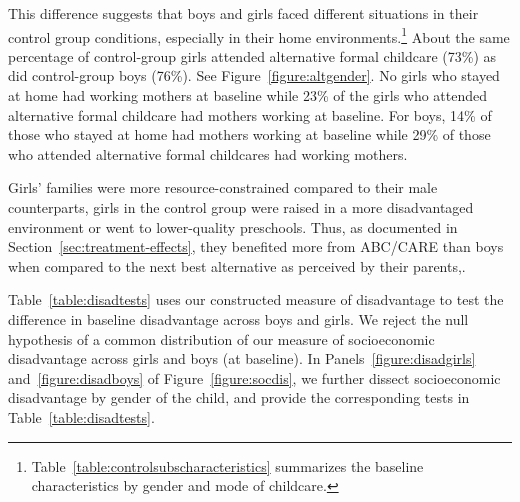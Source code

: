 This difference suggests that boys and girls faced different situations in their control group conditions, especially in their home environments.\footnote{Table~\ref{table:controlsubscharacteristics} summarizes the baseline characteristics by gender and mode of childcare.} About the same percentage of control-group girls attended alternative formal childcare (73\%) as did control-group boys (76\%). See Figure~\ref{figure:altgender}. No girls who stayed at home had working mothers at baseline while 23\% of the girls who attended alternative formal childcare had mothers working at baseline. For boys, 14\% of those who stayed at home had mothers working at baseline while 29\% of those who attended alternative formal childcares had working mothers.

Girls' families were more resource-constrained compared to their male counterparts, girls in the control group were raised in a more disadvantaged environment or went to lower-quality preschools. Thus, as documented in Section~\ref{sec:treatment-effects}, they benefited more from ABC/CARE than boys when compared to the next best alternative as perceived by their parents,.

Table~\ref{table:disadtests} uses our constructed measure of disadvantage to test the difference in baseline disadvantage across boys and girls. We reject the null hypothesis of a common distribution of our measure of socioeconomic disadvantage across girls and boys (at baseline). In Panels~\ref{figure:disadgirls} and~\ref{figure:disadboys} of Figure~\ref{figure:socdis}, we further dissect socioeconomic disadvantage by gender of the child, and provide the corresponding tests in Table~\ref{table:disadtests}.

